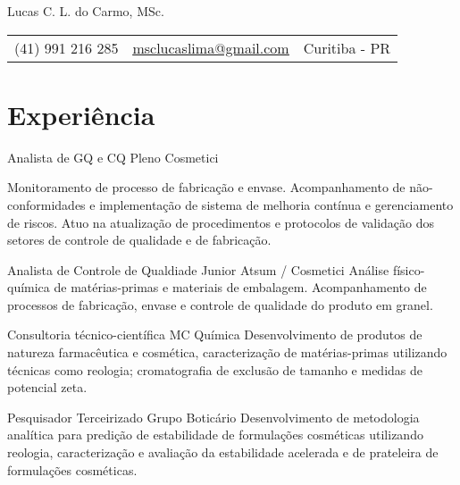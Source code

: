 \pagestyle{fancy} %
\fancyhf{} 
\renewcommand{\headrulewidth}{0pt}


\thispagestyle{empty}

\begin{center}
	
	{\LARGE Lucas C. L. do Carmo, MSc.}
	
	\vspace{6pt}
	\begin{tabular}{c|c|c}
		(41) 991 216 285 & \textcolor{Accent}{\underline{\href{mailto:msclucaslima@gmail.com}{msclucaslima@gmail.com}}} & Curitiba - PR
	\end{tabular}

	\vspace{6pt}
	
\end{center}
	

\section{Experiência}

{Analista de GQ e CQ Pleno}
{Cosmetici}
{
	Monitoramento de processo de fabricação e envase.
	Acompanhamento de não-conformidades e implementação de
	sistema de melhoria contínua e gerenciamento de riscos.
	Atuo na atualização de procedimentos e protocolos de validação dos setores
	de controle de qualidade e de fabricação.

}

{Analista de Controle de Qualdiade Junior}
{Atsum / Cosmetici}
{
	Análise físico-química de matérias-primas e materiais de embalagem.
	Acompanhamento de processos de fabricação, envase e controle de qualidade do
	produto em granel.
}

{Consultoria técnico-científica}
{MC Química}
{
	Desenvolvimento de produtos de natureza farmacêutica e cosmética, 
	caracterização de matérias-primas utilizando técnicas como reologia;
	cromatografia de exclusão de tamanho e medidas de potencial zeta.
}

{Pesquisador Terceirizado}
{Grupo Boticário}
{Desenvolvimento de metodologia analítica para predição de estabilidade
de formulações cosméticas utilizando reologia,
caracterização e avaliação da estabilidade acelerada e de prateleira
de formulações cosméticas.}

